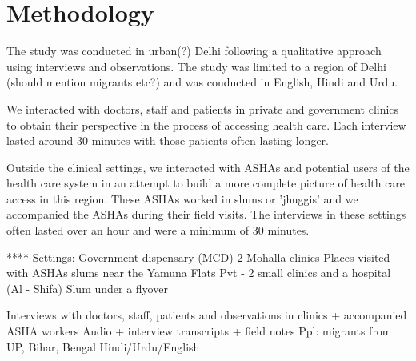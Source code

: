 \section{Methodology}

\begin{comment}
This should tell the story of what you did, and the single most important point is to show that you were reflective, rigorous, ethical, sound in your research. 
Start with where you conducted the study. Was there one site or many? How long was your (the authors’) engagement with this site? What was the nature of the engagement? And remember to anonymize by default.
Say what methods you used and who you studied. How long were your interviews? What kinds of questions did you ask? Did you use an interpreter? Who were these people? How old?
Add a paragraph on who the authors are and what they bring to the table. Say what their biases might have been that could be limitations of this work. Was there access you could not get? 
How did you analyze the data? If you used grounded theory, whose version of grounded theory did you use? Who was responsible for the analysis? 
Finally, there are lots of papers that have a decent write-up for methodology. Find a researcher you like and read up on the Methodology section.
\end{comment}

\textcolor{red}{}

The study was conducted in urban(?) Delhi following a qualitative approach using interviews and observations. The study was limited to a region of Delhi (should mention migrants etc?) and was conducted in English, Hindi and Urdu.

We interacted with doctors, staff and patients in private and government clinics to obtain their perspective in the process of accessing health care. Each interview lasted around 30 minutes with those patients often lasting longer. 

Outside the clinical settings, we interacted with ASHAs and potential users of the health care system in an attempt to build a more complete picture of health care access in this region. These ASHAs worked in slums or 'jhuggis' and we accompanied the ASHAs during their field visits. The interviews in these settings often lasted over an hour and were a minimum of 30 minutes.

****
Settings:
Government dispensary (MCD)
2 Mohalla clinics
Places visited with ASHAs
slums near the Yamuna
Flats
Pvt - 2 small clinics and a hospital (Al - Shifa)
Slum under a flyover

Interviews with doctors, staff, patients and observations in clinics + accompanied ASHA workers
Audio + interview transcripts + field notes
Ppl: migrants from UP, Bihar, Bengal
Hindi/Urdu/English